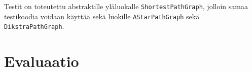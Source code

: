 \documentclass[10pt,a4paper]{article}
\begin{document}
Testit on toteutettu abstraktille yläluokalle \texttt{ShortestPathGraph}, jolloin samaa testikoodia voidaan käyttää sekä luokille \texttt{AStarPathGraph} sekä \texttt{DikstraPathGraph}.

\section{Evaluaatio}

 

\end{document}
